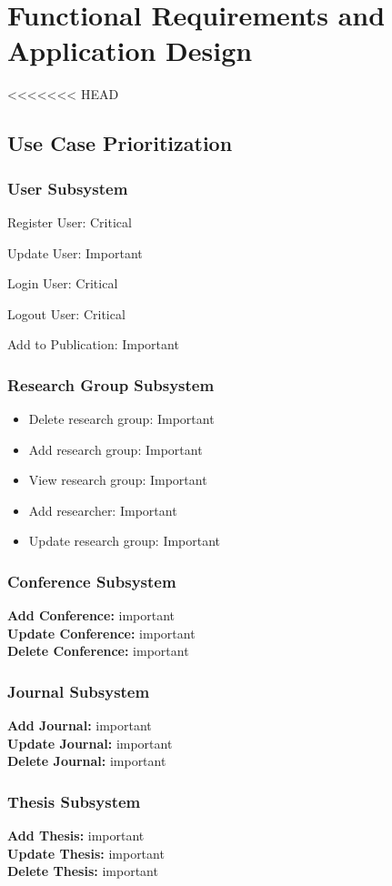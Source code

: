 \documentclass{article}
\begin{document}
	\section{Functional Requirements and Application Design}
<<<<<<< HEAD
	\subsection{Use Case Prioritization}
		\subsubsection{User Subsystem}
			Register User: Critical\par
			Update User: Important\par
			Login User: Critical\par
			Logout User: Critical\par
			Add to Publication: Important
		\subsubsection{Research Group Subsystem}
			\begin{itemize}
				\item Delete research group: Important 
				\item Add research group: Important
				\item View research group: Important
				\item Add researcher: Important
				\item Update research group: Important
			\end{itemize}
		\subsubsection{Conference Subsystem}
			\textbf{Add Conference:} important\\
			\textbf{Update Conference:} important\\
			\textbf{Delete Conference:} important
		\subsubsection{Journal Subsystem}
			\textbf{Add Journal:} important\\
			\textbf{Update Journal:} important\\
			\textbf{Delete Journal:} important
		\subsubsection{Thesis Subsystem}
			\textbf{Add Thesis:} important\\
			\textbf{Update Thesis:} important\\
			\textbf{Delete Thesis:} important
\end{document}
